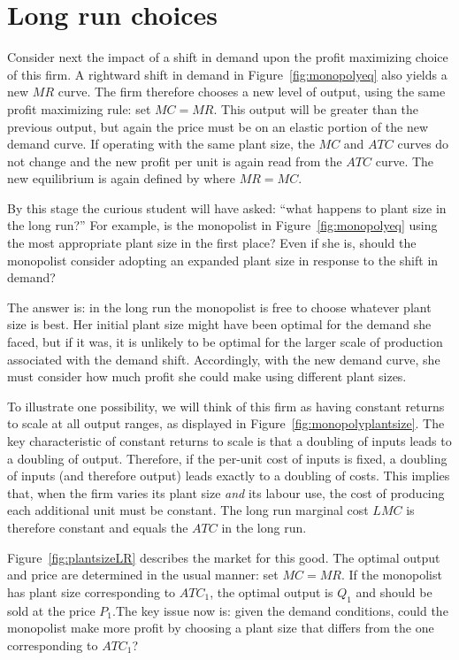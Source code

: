 \section{Long run choices}\label{sec:ch10sec3}

Consider next the impact of a shift in demand upon the profit maximizing choice of this firm. A rightward shift in demand in Figure~\ref{fig:monopolyeq} also yields a new $MR$ curve. The firm therefore chooses a new level of output, using the same profit maximizing rule: set $MC=MR$. This output will be greater than the previous output, but again the price must be on an elastic portion of the new demand curve. If operating with the same plant size, the $MC$ and $ATC$ curves do not change and the new profit per unit is again read from the $ATC$ curve. The new equilibrium is again defined by where $MR=MC$.

By this stage the curious student will have asked: ``what happens to plant size in the long run?'' For example, is the monopolist in Figure~\ref{fig:monopolyeq} using the most appropriate plant size in the first place? Even if she is, should the monopolist consider adopting an expanded plant size in response to the shift in demand?

The answer is: in the long run the monopolist is free to choose whatever plant size is best. Her initial plant size might have been optimal for the demand she faced, but if it was, it is unlikely to be optimal for the larger scale of production associated with the demand shift. Accordingly, with the new demand curve, she must consider how much profit she could make using different plant sizes.

To illustrate one possibility, we will think of this firm as having constant returns to scale at all output ranges, as displayed in Figure~\ref{fig:monopolyplantsize}. The key characteristic of constant returns to scale is that a doubling of inputs leads to a doubling of output. Therefore, if the per-unit cost of inputs is fixed, a doubling of inputs (and therefore output) leads exactly to a doubling of costs. This implies that, when the firm varies its plant size \textit{and} its labour use, the cost of producing each additional unit must be constant. The long run marginal cost $LMC$ is therefore constant and equals the $ATC$ in the long run. 



Figure~\ref{fig:plantsizeLR} describes the market for this good. The optimal output and price are determined in the usual manner: set $MC=MR$. If the monopolist has plant size corresponding to $ATC_1$, the optimal output is $Q_1$ and should be sold at the price $P_1$.The key issue now is: given the demand conditions, could the monopolist make more profit by choosing a plant size that differs from the one corresponding to $ATC_1$? 

